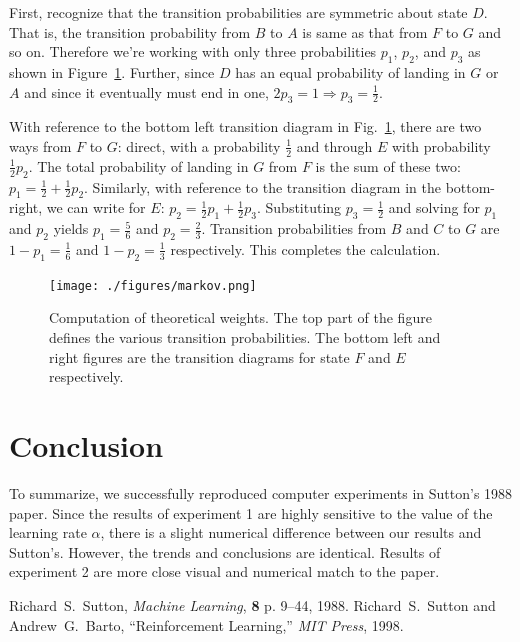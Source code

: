 \documentclass[conference]{IEEEtran}
\begin{document}
First, recognize that the transition probabilities are symmetric about state $D$. That is, the transition probability from $B$ to $A$ is same as that from $F$ to $G$ and so on. Therefore we're working with only three probabilities $p_1$, $p_2$, and $p_3$ as shown in Figure~\ref{fig:markov}. Further, since $D$ has an equal probability of landing in $G$ or $A$ and since it eventually must end in one, $2p_3 = 1\Rightarrow p_3=\frac{1}{2}$.

With reference to the bottom left transition diagram in Fig.~\ref{fig:markov}, there are two ways from $F$ to $G$: direct, with a probability $\frac{1}{2}$ and through $E$ with probability $\frac{1}{2}p_2$. The total probability of landing in $G$ from $F$ is the sum of these two: $p_1 = \frac{1}{2} + \frac{1}{2}p_2$. Similarly, with reference to the transition diagram in the bottom-right, we can write for $E$: $p_2 = \frac{1}{2}p_1 + \frac{1}{2}p_3$. Substituting $p_3=\frac{1}{2}$ and solving for $p_1$ and $p_2$ yields $p_1=\frac{5}{6}$ and $p_2=\frac{2}{3}$. Transition probabilities from $B$ and $C$ to $G$ are $1-p_1 = \frac{1}{6}$ and $1-p_2 = \frac{1}{3}$ respectively. This completes the calculation.
\begin{figure}[!bt]
\centering
\texttt{[image: ./figures/markov.png]}
\caption{Computation of theoretical weights. The top part of the figure defines the various transition probabilities. The bottom left and right figures are the transition diagrams for state $F$ and $E$ respectively.\label{fig:markov}}
\end{figure}
\section*{Conclusion}
To summarize, we successfully reproduced computer experiments in Sutton's 1988 paper. Since the results of experiment 1 are highly sensitive to the value of the learning rate $\alpha$, there is a slight numerical difference between our results and Sutton's. However, the trends and conclusions are identical. Results of experiment 2 are more close visual and numerical match to the paper. 
\begin{thebibliography}{1}
Richard~S.~Sutton, {\em Machine Learning}, {\bf 8} p. 9--44, 1988.
Richard~S.~Sutton and Andrew~G.~Barto, ``Reinforcement Learning,'' {\em MIT Press}, 1998.
\end{thebibliography}
\end{document}
